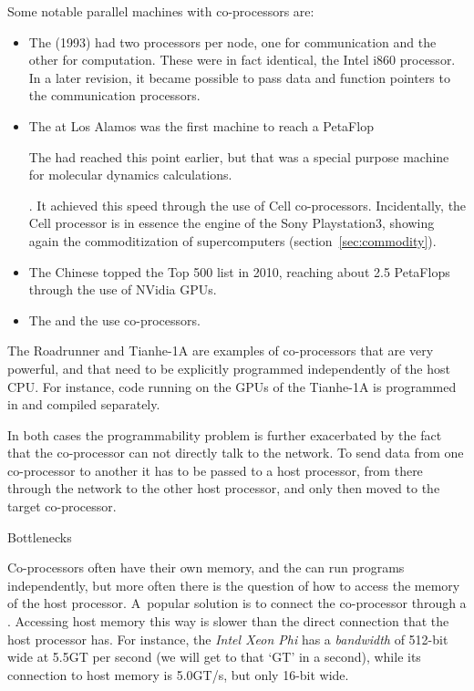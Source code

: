 Some notable parallel machines with co-processors are:
\begin{itemize}
\item The  (1993) had two processors per
  node, one for communication and the other for computation. These
  were in fact identical, the Intel i860
  processor. In a later revision, it became possible to pass data and
  function pointers to the communication processors.
\item The  at Los Alamos was the first
  machine to reach a PetaFlop
  \begin{footnoteenv}
    The 
    had reached this point earlier, but that was a special purpose
    machine for molecular dynamics calculations.
  \end{footnoteenv}%
  .
  It achieved this
  speed through the use of Cell
  co-processors. Incidentally, the Cell processor is in essence the
  engine of the Sony Playstation3, showing again the commoditization
  of supercomputers (section~\ref{sec:commodity}).
\item The Chinese  topped the Top 500 list in
  2010, reaching about 2.5 PetaFlops through the use of
  NVidia \acp{GPU}.
\item The  and the 
  use  co-processors.
\end{itemize}
The Roadrunner and Tianhe-1A are examples of co-processors that are
very powerful, and that need to be explicitly programmed independently
of the host CPU. For instance, code running on the \acp{GPU} of the
Tianhe-1A is programmed in  and compiled separately.

In both cases the programmability problem is further exacerbated by
the fact that the co-processor can not directly talk to the network.
To send data from one co-processor to another it has to be passed to a
host processor, from there through the network to the other host
processor, and only then moved to the target co-processor.


 {Bottlenecks}

Co-processors often have their own memory, and the
 can run programs independently, but
more often there is the question of how to access the memory of the
host processor. A~popular solution is to connect the co-processor
through a . Accessing host memory this way is
slower than the direct connection that the host processor has. For
instance, the \emph{Intel Xeon Phi} has a
\emph{bandwidth} of 512-bit wide at
5.5GT per second (we will get to that `GT' in a second), while its
connection to host memory is 5.0GT/s, but only 16-bit wide.

